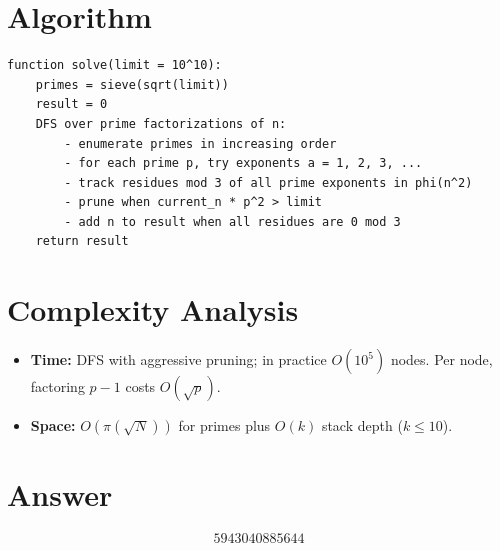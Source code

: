 \documentclass[a4paper,12pt]{article}
\begin{document}
\section{Algorithm}

\begin{verbatim}
function solve(limit = 10^10):
    primes = sieve(sqrt(limit))
    result = 0
    DFS over prime factorizations of n:
        - enumerate primes in increasing order
        - for each prime p, try exponents a = 1, 2, 3, ...
        - track residues mod 3 of all prime exponents in phi(n^2)
        - prune when current_n * p^2 > limit
        - add n to result when all residues are 0 mod 3
    return result
\end{verbatim}

\section{Complexity Analysis}
\begin{itemize}
    \item \textbf{Time:} DFS with aggressive pruning; in practice $O(10^5)$ nodes. Per node, factoring $p-1$ costs $O(\sqrt{p})$.
    \item \textbf{Space:} $O(\pi(\sqrt{N}))$ for primes plus $O(k)$ stack depth ($k \le 10$).
\end{itemize}

\section{Answer}

\[
\boxed{5943040885644}
\]
\end{document}

